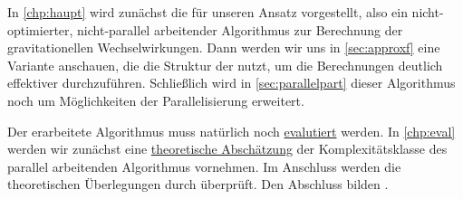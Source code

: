     In \autoref{chp:haupt} wird zunächst die  für unseren Ansatz vorgestellt, also ein nicht-optimierter, nicht-parallel arbeitender Algorithmus zur Berechnung der gravitationellen
    Wechselwirkungen. Dann werden wir uns in \autoref{sec:approxf} eine Variante anschauen, die die Struktur der nutzt, um die Berechnungen deutlich effektiver durchzuführen.
    Schließlich wird in \autoref{sec:parallelpart} dieser Algorithmus noch um Möglichkeiten der Parallelisierung erweitert.
    
    Der erarbeitete Algorithmus muss natürlich noch \hyperref[chp:eval]{evalutiert} werden. In \autoref{chp:eval} werden wir zunächst eine \hyperref[sec:theo]{theoretische Abschätzung} der 
    Komplexitätsklasse des parallel arbeitenden Algorithmus vornehmen. Im Anschluss werden die theoretischen Überlegungen durch  überprüft. 
    Den Abschluss bilden . 